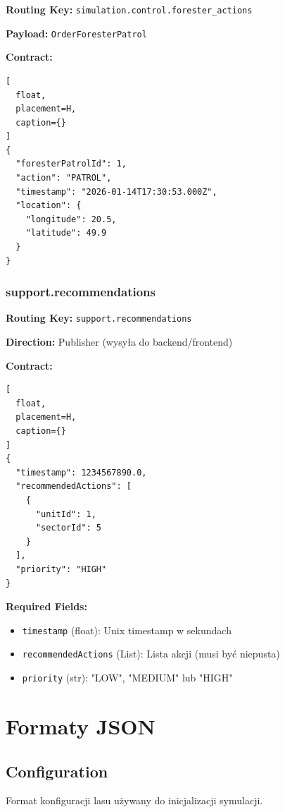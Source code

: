 \textbf{Routing Key:} \texttt{simulation.control.forester\_actions}

\textbf{Payload:} \texttt{OrderForesterPatrol}

\textbf{Contract:}
\begin{lstlisting}[
  float,
  placement=H,
  caption={}
] 
{
  "foresterPatrolId": 1,
  "action": "PATROL",
  "timestamp": "2026-01-14T17:30:53.000Z",
  "location": {
    "longitude": 20.5,
    "latitude": 49.9
  }
}
\end{lstlisting}

\subsubsection{support.recommendations}

\textbf{Routing Key:} \texttt{support.recommendations}

\textbf{Direction:} Publisher (wysyła do backend/frontend)

\textbf{Contract:}
\begin{lstlisting}[
  float,
  placement=H,
  caption={}
] 
{
  "timestamp": 1234567890.0,
  "recommendedActions": [
    {
      "unitId": 1,
      "sectorId": 5
    }
  ],
  "priority": "HIGH"
}
\end{lstlisting}

\textbf{Required Fields:}
\begin{itemize}
    \item \texttt{timestamp} (float): Unix timestamp w sekundach
    \item \texttt{recommendedActions} (List): Lista akcji (musi być niepusta)
    \item \texttt{priority} (str): "LOW", "MEDIUM" lub "HIGH"
\end{itemize}

\section{Formaty JSON}

\subsection{Configuration}

Format konfiguracji lasu używany do inicjalizacji symulacji.


